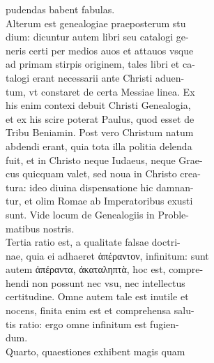 \documentclass{article}
\begin{document}
\begin{pages}
                pudendas babent fabulas. \\
                Alterum est genealogiae praeposterum stu \\
                dium: dicuntur autem libri seu catalogi ge- \\
                neris certi per medios auos et attauos vsque \\
                ad primam stirpis originem, tales libri et ca- \\
                talogi erant necessarii ante Christi aduen- \\
                tum, vt constaret de certa Messiae linea. Ex \\
                his enim contexi debuit Christi Genealogia, \\
                et ex his scire poterat Paulus, quod esset de \\
                Tribu Beniamin. Post vero Christum natum \\
                abdendi erant, quia tota illa politia delenda \\
                fuit, et in Christo neque Iudaeus, neque Grae- \\
                cus quicquam valet, sed noua in Christo crea- \\
                tura: ideo diuina dispensatione hic damnan- \\
                tur, et olim Romae ab Imperatoribus exusti \\
                sunt. Vide locum de Genealogiis in Proble- \\
                matibus nostris. \\
                Tertia ratio est, a qualitate falsae doctri- \\
                nae, quia ei adhaeret ἀπέραντον, infinitum: sunt \\
                autem ἀπέραντα, ἀκαταληπτὰ, hoc est, compre- \\
                hendi non possunt nec vsu, nec intellectus \\
                certitudine. Omne autem tale est inutile et \\
                nocens, finita enim est et comprehensa salu- \\
                tis ratio: ergo omne infinitum est fugien- \\
                dum. \\
                Quarto, quaestiones exhibent magis quam \\

\end{pages}
\end{document}
